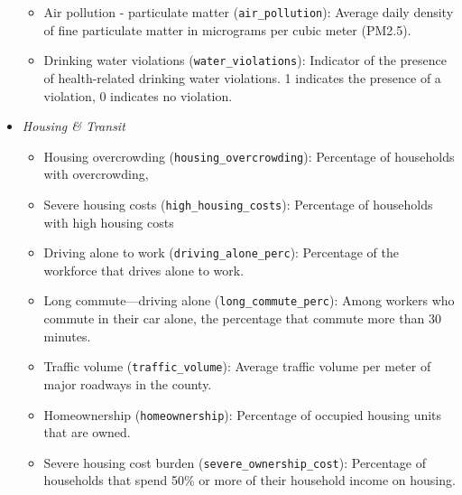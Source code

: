 \documentclass[
]{article}
\providecommand{\tightlist}{%
  \setlength{\itemsep}{0pt}\setlength{\parskip}{0pt}}
\begin{document}
\begin{itemize}
  \begin{itemize}
  \tightlist
  \item
    Air pollution - particulate matter (\texttt{air\_pollution}): Average daily density of fine particulate matter in micrograms per cubic meter (PM2.5).
  \item
    Drinking water violations (\texttt{water\_violations}): Indicator of the presence of health-related drinking water violations. 1 indicates the presence of a violation, 0 indicates no violation.
  \end{itemize}
\item
  \emph{Housing \& Transit}

  \begin{itemize}
  \tightlist
  \item
    Housing overcrowding (\texttt{housing\_overcrowding}): Percentage of households with overcrowding,
  \item
    Severe housing costs (\texttt{high\_housing\_costs}): Percentage of households with high housing costs
  \item
    Driving alone to work (\texttt{driving\_alone\_perc}): Percentage of the workforce that drives alone to work.
  \item
    Long commute---driving alone (\texttt{long\_commute\_perc}): Among workers who commute in their car alone, the percentage that commute more than 30 minutes.
  \item
    Traffic volume (\texttt{traffic\_volume}): Average traffic volume per meter of major roadways in the county.
  \item
    Homeownership (\texttt{homeownership}): Percentage of occupied housing units that are owned.
  \item
    Severe housing cost burden (\texttt{severe\_ownership\_cost}): Percentage of households that spend 50\% or more of their household income on housing.
  \end{itemize}
\end{itemize}
\end{document}
